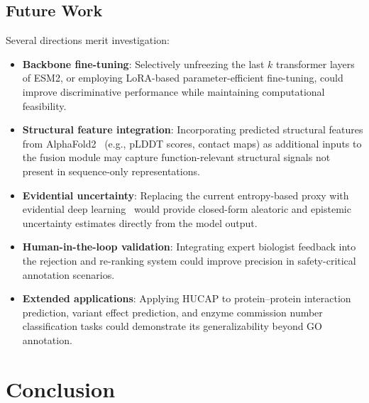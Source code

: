 \documentclass[conference]{IEEEtran}
\begin{document}
\subsection{Future Work}
Several directions merit investigation:
\begin{itemize}
    \item \textbf{Backbone fine-tuning}: Selectively unfreezing the last $k$ transformer layers of ESM2, or employing LoRA-based parameter-efficient fine-tuning, could improve discriminative performance while maintaining computational feasibility.
    \item \textbf{Structural feature integration}: Incorporating predicted structural features from AlphaFold2~\cite{jumper2021} (e.g., pLDDT scores, contact maps) as additional inputs to the fusion module may capture function-relevant structural signals not present in sequence-only representations.
    \item \textbf{Evidential uncertainty}: Replacing the current entropy-based proxy with evidential deep learning~\cite{sensoy2018} would provide closed-form aleatoric and epistemic uncertainty estimates directly from the model output.
    \item \textbf{Human-in-the-loop validation}: Integrating expert biologist feedback into the rejection and re-ranking system could improve precision in safety-critical annotation scenarios.
    \item \textbf{Extended applications}: Applying HUCAP to protein--protein interaction prediction, variant effect prediction, and enzyme commission number classification tasks could demonstrate its generalizability beyond GO annotation.
\end{itemize}

\section{Conclusion}
\end{document}
